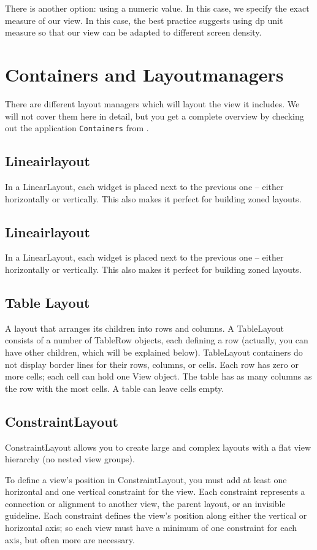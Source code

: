 There is another option: using a numeric value. In this case, we specify the exact measure of our view. In this case, the best
practice suggests using dp unit measure so that our view can be adapted to different screen density.


\section{Containers and Layoutmanagers}
There are different layout managers which will layout the view it includes. We will not cover them here in detail, but you get a complete overview by checking out the application \texttt{Containers} from \cite{murphymarkl.2017}.

\subsection{Lineairlayout}
In a LinearLayout, each widget is placed next to the previous one – either horizontally or vertically. This also makes it perfect for building zoned layouts.

\subsection{Lineairlayout}
In a LinearLayout, each widget is placed next to the previous one – either horizontally or vertically. This also makes it perfect for building zoned layouts.

\subsection{Table Layout}
A layout that arranges its children into rows and columns. A TableLayout consists of a number of TableRow objects, each defining a row (actually, you can have other children, which will be explained below). TableLayout containers do not display border lines for their rows, columns, or cells. Each row has zero or more cells; each cell can hold one View object. The table has as many columns as the row with the most cells. A table can leave cells empty. 

\subsection{ConstraintLayout}
ConstraintLayout allows you to create large and complex layouts with a flat view hierarchy (no nested view groups). 

To define a view's position in ConstraintLayout, you must add at least one horizontal and one vertical constraint for the view. Each constraint represents a connection or alignment to another view, the parent layout, or an invisible guideline. Each constraint defines the view's position along either the vertical or horizontal axis; so each view must have a minimum of one constraint for each axis, but often more are necessary.


